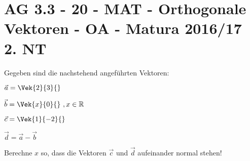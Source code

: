 \section{AG 3.3 - 20 - MAT - Orthogonale Vektoren - OA - Matura 2016/17 2. NT}

\begin{beispiel}{1} %
Gegeben sind die nachstehend angeführten Vektoren:

$\vec{a}=\Vek{2}{3}{}$ 

$\vec{b}=\Vek{x}{0}{}~,x\in \mathbb R$

$\vec{c}=\Vek{1}{-2}{}$

$\vec{d}=\vec{a}-\vec{b}$\leer

Berechne $x$ so, dass die Vektoren $\vec{c}$ und $\vec{d}$ aufeinander normal stehen!

\end{beispiel}